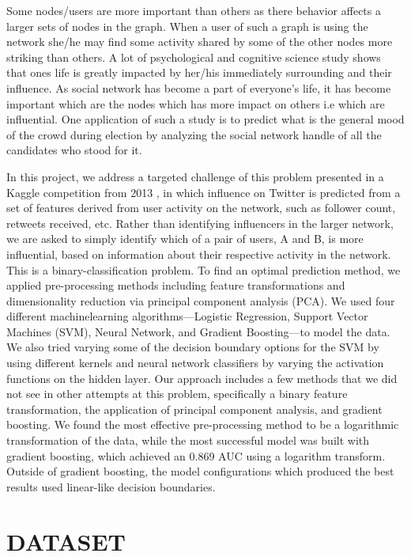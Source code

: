 \documentclass[conference]{IEEEtran}
\numberwithin{equation}{section}
\numberwithin{figure}{section}
\numberwithin{table}{section}
\begin{document}
Some nodes/users are more important than others as there behavior affects a larger sets of nodes in the graph. When a user of such a graph is using the network she/he may find some activity shared by some of the other nodes more striking than others. A lot of psychological and cognitive science study shows that ones life is greatly impacted by her/his immediately surrounding and their influence. As social network has become a part of everyone's life, it has become important which are the nodes which has more impact on others i.e which are influential. One application of such a study is to predict what is the general mood of the crowd during election by analyzing the social network handle of all the candidates who stood for it. 

In this project, we address a targeted challenge of this problem presented in a Kaggle competition from 2013 , in which influence on Twitter is predicted from a set of features derived from user activity on the network, such as follower count, retweets received, etc. Rather than identifying influencers in the larger network, we are asked to simply identify which of a pair of users, A and B, is more influential, based on information about their respective activity in the network. This is a binary-classification problem. To find an optimal prediction method, we applied pre-processing methods including feature transformations and dimensionality reduction via principal component analysis (PCA). We used four different machinelearning algorithms—Logistic Regression, Support Vector Machines (SVM), Neural Network, and Gradient Boosting—to model the data. We also tried varying some of the decision boundary options for the SVM by using different kernels and neural network classifiers by varying the activation functions on the hidden layer. Our approach includes a few methods that we did not see in other attempts at this problem, specifically a binary feature transformation, the application of principal component analysis, and gradient boosting. We found the most effective pre-processing method to be a logarithmic transformation of the data, while the most successful model was built with gradient boosting, which achieved an 0.869 AUC using a logarithm transform. Outside of gradient boosting, the model configurations which produced the best results used linear-like decision boundaries.
 

\section{DATASET}\label{sec:page-layout}
\end{document}
